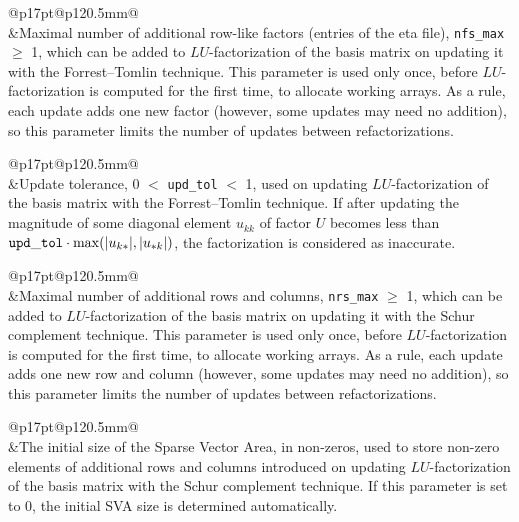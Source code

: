 \medskip

\noindent\begin{tabular}{@{}p{17pt}@{}p{120.5mm}@{}}
 \\
&Maximal number of additional row-like factors (entries of the eta
file), \verb|nfs_max| $\geq$ 1, which can be added to $LU$-factorization
of the basis matrix on updating it with the Forrest--Tomlin technique.
This parameter is used only once, before $LU$-factorization is computed
for the first time, to allocate working arrays. As a rule, each update
adds one new factor (however, some updates may need no addition), so
this parameter limits the number of updates between refactorizations.\\
\end{tabular}

\medskip

\noindent\begin{tabular}{@{}p{17pt}@{}p{120.5mm}@{}}
 \\
&Update tolerance, 0 $<$ \verb|upd_tol| $<$ 1, used on updating
$LU$-factorization of the basis matrix with the Forrest--Tomlin
technique. If after updating the magnitude of some diagonal element
$u_{kk}$ of factor $U$ becomes less than
${\tt upd\_tol}\cdot\max(|u_{k*}|, |u_{*k}|)$, the factorization is
considered as inaccurate.\\
\end{tabular}

\medskip

\noindent\begin{tabular}{@{}p{17pt}@{}p{120.5mm}@{}}
 \\
&Maximal number of additional rows and columns, \verb|nrs_max| $\geq$ 1,
which can be added to $LU$-factorization of the basis matrix on updating
it with the Schur complement technique. This parameter is used only
once, before $LU$-factorization is computed for the first time, to
allocate working arrays. As a rule, each update adds one new row and
column (however, some updates may need no addition), so this parameter
limits the number of updates between refactorizations.\\
\end{tabular}

\medskip

\noindent\begin{tabular}{@{}p{17pt}@{}p{120.5mm}@{}}
 \\
&The initial size of the Sparse Vector Area, in non-zeros, used to
store non-zero elements of additional rows and columns introduced on
updating $LU$-factorization of the basis matrix with the Schur
complement technique. If this parameter is set to 0, the initial SVA
size is determined automatically.\\
\end{tabular}

